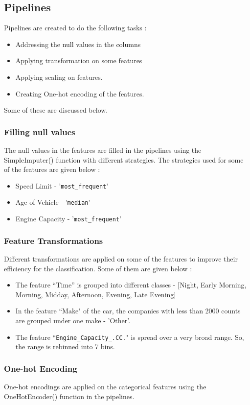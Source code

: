 \documentclass[12pt]{article}
\begin{document}
\subsection{Pipelines}
Pipelines are created to do the following tasks :
\begin{itemize}
\item Addressing the null values in the columns
\item Applying transformation on some features
\item Applying scaling on features.
\item Creating One-hot encoding of the features.
\end{itemize}
Some of these are discussed below.
\subsubsection*{Filling null values}
The null values in the features are filled in the pipelines using the SimpleImputer() function with different strategies. The strategies used for some of the features are given below :
\begin{itemize}
\item Speed Limit - '\verb|most_frequent|'
\item Age of Vehicle - '\verb|median|'
\item Engine Capacity - '\verb|most_frequent|'
\end{itemize}
\subsubsection*{Feature Transformations}
Different transformations are applied on some of the features to improve their efficiency for the classification. Some of them are given below :
\begin{itemize}
\item The feature ``Time'' is grouped into different classes - [Night, Early Morning, Morning, Midday, Afternoon, Evening, Late Evening]
\item In the feature ``Make" of the car, the companies with less than 2000 counts are grouped under one make - 'Other'.
\item The feature ``\verb|Engine_Capacity_.CC.|" is spread over a very broad range. So, the range is rebinned into 7 bins.
\end{itemize}
\subsubsection*{One-hot Encoding}
One-hot encodings are applied on the categorical features using the OneHotEncoder() function in the pipelines.
\end{document}
